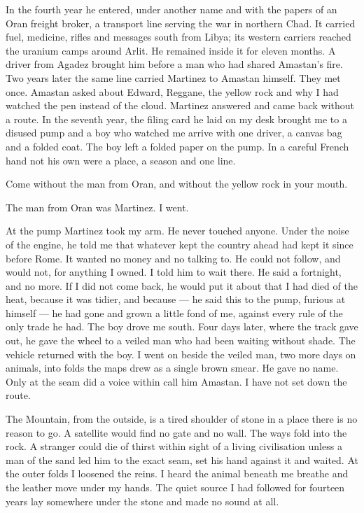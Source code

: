 In the fourth year he entered, under another name and with the papers of an Oran freight broker, a transport line serving the war in northern Chad. It carried fuel, medicine, rifles and messages south from Libya; its western carriers reached the uranium camps around Arlit. He remained inside it for eleven months. A driver from Agadez brought him before a man who had shared Amastan's fire. Two years later the same line carried Martinez to Amastan himself. They met once. Amastan asked about Edward, Reggane, the yellow rock and why I had watched the pen instead of the cloud. Martinez answered and came back without a route. In the seventh year, the filing card he laid on my desk brought me to a disused pump and a boy who watched me arrive with one driver, a canvas bag and a folded coat. The boy left a folded paper on the pump. In a careful French hand not his own were a place, a season and one line.\par

\begin{scripture}
Come without the man from Oran, and without the yellow rock in your mouth.
\end{scripture}

The man from Oran was Martinez. I went.\par

At the pump Martinez took my arm. He never touched anyone. Under the noise of the engine, he told me that whatever kept the country ahead had kept it since before Rome. It wanted no money and no talking to. He could not follow, and would not, for anything I owned. I told him to wait there. He said a fortnight, and no more. If I did not come back, he would put it about that I had died of the heat, because it was tidier, and because --- he said this to the pump, furious at himself --- he had gone and grown a little fond of me, against every rule of the only trade he had. The boy drove me south. Four days later, where the track gave out, he gave the wheel to a veiled man who had been waiting without shade. The vehicle returned with the boy. I went on beside the veiled man, two more days on animals, into folds the maps drew as a single brown smear. He gave no name. Only at the seam did a voice within call him Amastan. I have not set down the route.\par

The Mountain, from the outside, is a tired shoulder of stone in a place there is no reason to go. A satellite would find no gate and no wall. The ways fold into the rock. A stranger could die of thirst within sight of a living civilisation unless a man of the sand led him to the exact seam, set his hand against it and waited. At the outer folds I loosened the reins. I heard the animal beneath me breathe and the leather move under my hands. The quiet source I had followed for fourteen years lay somewhere under the stone and made no sound at all.\par

